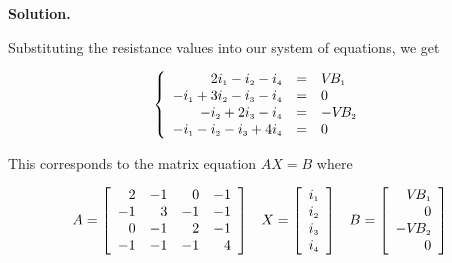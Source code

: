 \documentclass{ximera}
\begin{document}
\begin{ex}
\begin{multicols}{2}
\begin{itemize}
\end{itemize} 

\end{multicols}


{\bf Solution.}  

 Substituting the resistance values into our system of equations, we get

\[ \left\{ \begin{array}{rcl} 2i_{\mbox{\tiny$1$}} - i_{\mbox{\tiny$2$}}-i_{\mbox{\tiny$4$}} & = & V\!B_{\mbox{\tiny$1$}} \\
-i_{\mbox{\tiny$1$}} + 3i_{\mbox{\tiny$2$}} - i_{\mbox{\tiny$3$}} - i_{\mbox{\tiny$4$}} & = & 0 \\
-i_{\mbox{\tiny$2$}} + 2i_{\mbox{\tiny$3$}} - i_{\mbox{\tiny$4$}} & = & -V\!B_{\mbox{\tiny$2$}} \\
-i_{\mbox{\tiny$1$}} - i_{\mbox{\tiny$2$}}-i_{\mbox{\tiny$3$}} + 4i_{\mbox{\tiny$4$}} & = & 0 \\  \end{array} \right.\]
                              
This corresponds to the matrix equation $AX = B$ where 

\[ \begin{array}{ccc} 

A = \left[ \begin{array}{rrrr} 2 & -1 & 0 & -1  \\ -1 & 3 & -1 & -1 \\ 0 & -1 & 2 & -1 \\ -1 & -1 & -1 & 4 \end{array} \right] 

&

 X = \left[ \begin{array}{r} i_{\mbox{\tiny$1$}} \\ i_{\mbox{\tiny$2$}} \\ i_{\mbox{\tiny$3$}} \\ i_{\mbox{\tiny$4$}} \\ \end{array} \right]
 
&

 B = \left[ \begin{array}{r} V\!B_{\mbox{\tiny$1$}} \\ 0 \\ -V\!B_{\mbox{\tiny$2$}} \\ 0 \end{array} \right] 
 \end{array}\]   


\end{ex}
\end{document}
